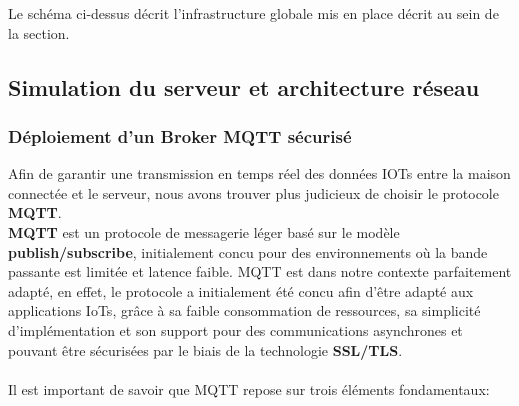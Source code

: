 \documentclass[10pt, a4paper]{report}
\begin{document}
	Le schéma ci-dessus décrit l'infrastructure globale mis en place décrit au sein de la section.
	
	
 
	\subsection{Simulation du serveur et architecture réseau}
	\subsubsection{Déploiement d'un Broker MQTT sécurisé}
	
	Afin de garantir une transmission en temps réel des données IOTs entre la maison connectée et le serveur, nous avons trouver plus judicieux de choisir le protocole \textbf{MQTT}.\\
	\textbf{MQTT} est un protocole de messagerie léger basé sur le modèle \textbf{publish/subscribe}, initialement concu pour des environnements où la bande passante est limitée et latence faible. MQTT est dans notre contexte parfaitement adapté, en effet, le protocole a initialement été concu afin d'être adapté aux applications IoTs, grâce à sa faible consommation de ressources, sa simplicité d'implémentation et son support pour des communications asynchrones et pouvant être sécurisées par le biais de la technologie \textbf{SSL/TLS}.\\\\
	Il est important de savoir que MQTT repose sur trois éléments fondamentaux:
\end{document}
